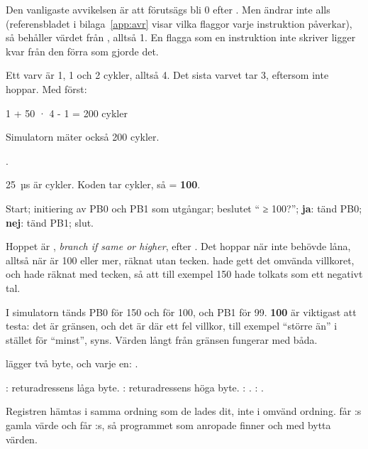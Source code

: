 Den vanligaste avvikelsen är att  förutsägs bli 0 efter . Men 
ändrar inte  alls (referensbladet i bilaga~\ref{app:avr} visar vilka flaggor varje
instruktion påverkar), så  behåller värdet från , alltså 1. En flagga som en
instruktion inte skriver ligger kvar från den förra som gjorde det.

Ett varv är  1,  1 och  2 cykler, alltså 4. Det sista varvet
tar 3, eftersom  inte hoppar. Med  först:

\begin{textdrawing}
1 + 50 · 4 - 1 = 200 cykler
\end{textdrawing}

\noindent Simulatorn mäter också 200 cykler.

.

25~µs är  cykler. Koden tar  cykler, så
 = \textbf{100}.

Start; initiering av PB0 och PB1 som utgångar; beslutet \enquote{ ≥ 100?};
\textbf{ja}: tänd PB0; \textbf{nej}: tänd PB1; slut.

Hoppet är , \emph{branch if same or higher}, efter . Det
hoppar när  inte behövde låna, alltså när  är 100 eller mer, räknat utan
tecken.  hade gett det omvända villkoret, och  hade räknat med tecken, så att
till exempel 150 hade tolkats som ett negativt tal.

I simulatorn tänds PB0 för 150 och för 100, och PB1 för 99. \textbf{100} är viktigast att
testa: det är gränsen, och det är där ett fel villkor, till exempel \enquote{större än} i stället
för \enquote{minst}, syns. Värden långt från gränsen fungerar med båda.

 lägger två byte, och varje  en: .

: returadressens låga byte. : returadressens höga byte.
: . : .

Registren hämtas i samma ordning som de lades dit, inte i omvänd ordning.  får
:s gamla värde och  får :s, så programmet som anropade
 finner  och  med bytta värden.

